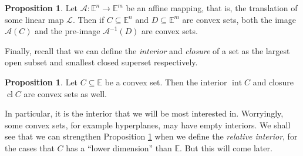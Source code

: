 \documentclass[11pt]{article}
\numberwithin{equation}{section}
\theoremstyle{definition}
\newtheorem{proposition}[theorem]{Proposition}
\newcommand{\bE}{\mathbb{E}}
\newcommand{\cA}{\mathcal{A}}
\newcommand{\cL}{\mathcal{L}}
\newcommand{\scl}{\operatorname{cl}}
\newcommand{\sint}{\operatorname{int}}
\begin{document}
\begin{proposition}
    Let $\cA:\bE^n\to\bE^m$ be an affine mapping, that is, the translation of some linear map $\cL$. Then if $C\subseteq\bE^n$ and $D\subseteq\bE^m$ are convex sets, both the image $\cA(C)$ and the pre-image $\cA^{-1}(D)$ are convex sets.
\end{proposition}

Finally, recall that we can define the \textit{interior} and \textit{closure} of a set as the largest open subset and smallest closed superset respectively.
\begin{proposition}
    \label{prpconvexintcl}
    Let $C\subseteq\bE$ be a convex set. Then the interior $\sint C$ and closure $\scl C$ are convex sets as well.
\end{proposition}
In particular, it is the interior that we will be most interested in. Worryingly, some convex sets, for example hyperplanes, may have empty interiors. We shall see that we can strengthen Proposition \ref{prpconvexintcl} when we define the \textit{relative interior}, for the cases that $C$ has a ``lower dimension'' than $\bE$. But this will come later.
\end{document}
